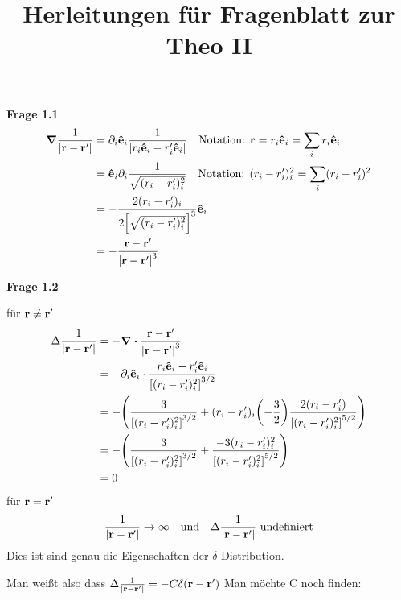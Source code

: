 
\title{Herleitungen für Fragenblatt zur Theo II}

   
  \newpage

  \textbf{Frage 1.1}
  \begin{equation*}
    \begin{split}
      \grad \frac{1}{\abs{\vb{r}-\vb{r}'}} 
        &= \partial_i \vu e_i \frac{1}{\abs{r_i \vu e_i - r_i' \vu e_i}}
        \quad\text{Notation: } \vb r = r_i \vu e_i = \sum_i r_i \vu e_i\\
        &= \vu e_i \partial_i \frac{1}{\sqrt{(r_i-r_i')_i^2}}
        \quad\text{Notation: }(r_i-r'_i)^2_i=\sum_i(r_i-r'_i)^2\\
        &= 
        -\frac{2(r_i-r_i')_i}{2\qty[\sqrt{(r_i-r_i')_i^2}]^{3}}\vu e_i \\
        &= -\frac{\vb r - \vb r'}{\abs{\vb r - \vb r'}^3} 
    \end{split}
  \end{equation*}

  \textbf{Frage 1.2}

  für $\vb r \neq \vb r'$
  \begin{equation*}
    \begin{split}
      \Delta \frac{1}{\abs{\vb{r}-\vb{r}'}}
      &=-\div\frac{\vb r - \vb r'}{\abs{\vb r - \vb r'}^3}\\  
      &=-\partial_i \vu e_i \cdot 
      \frac{r_i \vu e_i - r'_i \vu e_i}
      {\qty[(r_i - r'_i)_i^2]^{3/2}}\\  
      &=-\qty(
      \frac{3}{\qty[(r_i - r'_i)_i^2]^{3/2}}
      +(r_i-r'_i)_i\qty(-\frac{3}{2})\frac{2(r_i-r'_i)}
      {{\qty[(r_i-r'_i)_i^2]}^{5/2}}
      )\\  
      &=-\qty(
      \frac{3}{\qty[(r_i-r'_i)_i^2]^{3/2}} 
      + \frac{-3(r_i-r'_i)_i^2}{\qty[(r_i-r'_i)_i^2]^{5/2}}
      )\\
      &=0
    \end{split}
  \end{equation*}
  für $\vb r=\vb r'$
  \begin{equation*}
    \frac{1}{\abs{\vb{r}-\vb{r}'}}\to \infty\quad \text{und}\quad \Delta\frac{1}{\abs{\vb{r}-\vb{r}'}}\ \text{undefiniert}
  \end{equation*}
  Dies ist sind genau die Eigenschaften der $\delta$-Distribution.

  Man weißt also dass $\Delta \frac{1}{\abs{\vb{r}-\vb{r}'}}=-C\delta(\vb r - \vb r')$
  Man möchte C noch finden:

